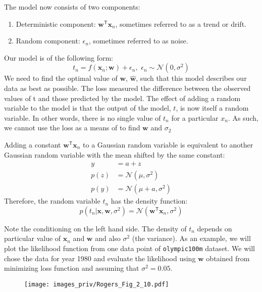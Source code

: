 \documentclass[a4paper,11pt]{article} %
\newcommand{\txtinline}[1]{\texttt{#1}}
\begin{document}
The model now consists of two components:
\begin{enumerate}
\item Deterministic component: $\mathbf{w}^{\mathsf{T}}\mathbf{x}_{n}$, sometimes referred to
as a trend or drift.
\item Random component: $\epsilon_{n}$, sometimes referred to as noise.
\end{enumerate}

Our model is of the following form:
\begin{equation}
t_{n} = f(\mathbf{x}_{n}; \mathbf{w}) + \epsilon_{n}, \,\, \epsilon_{n} \sim \mathcal{N}(0,\sigma^2)
\end{equation}
We need to find the optimal value of $\mathbf{w}$, $\widehat{\mathbf{w}}$, such that this model describes
our data as best as possible.
The loss measured the difference between the observed
values of t and those predicted by the model. The effect of adding a random variable
to the model is that the output of the model, $t$, is now itself a random variable. In
other words, there is no single value of $t_n$ for a particular $x_n$.
As such, we cannot use the loss as a means of to find $\mathbf{w}$
and $\sigma_{2}$

Adding a constant $\mathbf{w}^{\mathsf{T}}\mathbf{x}_{n}$ to a
Gaussian random variable is equivalent to another Gaussian random variable
with the mean shifted by the same constant:
\begin{align*}
y & = a + z \\
p(z) & = \mathcal{N}(\mu,\sigma^2) \\
p(y) & = \mathcal{N}(\mu + a,\sigma^2)
\end{align*}
Therefore, the random variable $t_n$ has the density function:
\begin{equation}
p(t_{n}|\mathbf{x},\mathbf{w},\sigma^2) =
\mathcal{N}(\mathbf{w}^{\mathsf{T}}\mathbf{x}_{n},\sigma^2)
\end{equation}

Note the conditioning on the left hand side. The density of $t_n$ depends on particular
value  of $\mathbf{x}_{n}$ and $\mathbf{w}$ and also $\sigma^2$ (the variance).
As an example, we will plot the likelihood function from one data point of
\txtinline{olympic100m} dataset. We will chose the data for year 1980 and evaluate
the likelihood using $\mathbf{w}$ obtained from minimizing loss function and
assuming that $\sigma^2=0.05$.

\begin{figure}[H]
\begin{center}
\texttt{[image: images\_priv/Rogers\_Fig\_2\_10.pdf]}
\end{center}
\end{figure}
\end{document}
